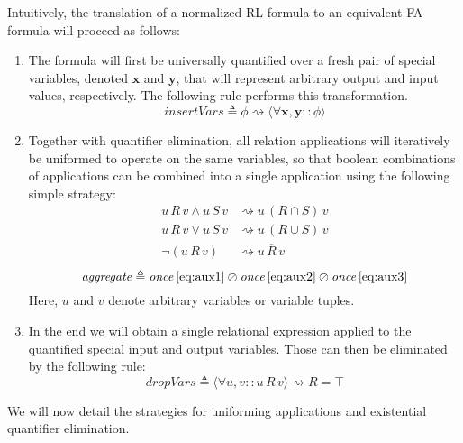 \documentclass{llncs}
\begin{document}
Intuitively, the translation of a normalized RL formula to an
equivalent FA formula will proceed as follows:
\begin{enumerate}
\item The formula will first be universally quantified over a fresh
  pair of special variables, denoted $\mathbf{x}$ and $\mathbf{y}$, that will represent
  arbitrary output and input values, respectively. The following rule
  performs this transformation.
  \begin{equation*}
    \mathit{insertVars} \triangleq \phi \rightsquigarrow \langle \forall \mathbf{x},\mathbf{y} :: \phi \rangle
  \end{equation*}
\item Together with quantifier elimination, all relation applications
  will iteratively be uniformed to operate on the same variables, so
  that boolean combinations of applications can be combined into a
  single application using the following simple strategy:
  \begin{align}
    u \, R \, v \wedge u \, S \, v & \rightsquigarrow u \, (R \cap S) \, v \label{eq:aux1} \\
    u \, R \, v \vee u \, S \, v & \rightsquigarrow u \, (R \cup S) \, v \label{eq:aux2} \\
    \neg (u \, R \, v) & \rightsquigarrow u \, \overline{R} \, v \label{eq:aux3}
  \end{align}
  \begin{equation*}
    \mathit{aggregate} \triangleq \mathit{once} \, \eqref{eq:aux1} \oslash \mathit{once} \, \eqref{eq:aux2} \oslash \mathit{once} \, \eqref{eq:aux3}
  \end{equation*}
  Here, $u$ and $v$ denote arbitrary variables or variable tuples.
\item In the end we will obtain a single relational expression applied
  to the quantified special input and output variables. Those can then
  be eliminated by the following rule:
  \begin{equation*}
    \mathit{dropVars} \triangleq \langle \forall u,v :: u \, R \, v \rangle \rightsquigarrow R = \top
  \end{equation*}

\end{enumerate}
We will now detail the strategies for uniforming applications and
existential quantifier elimination.
\end{document}
